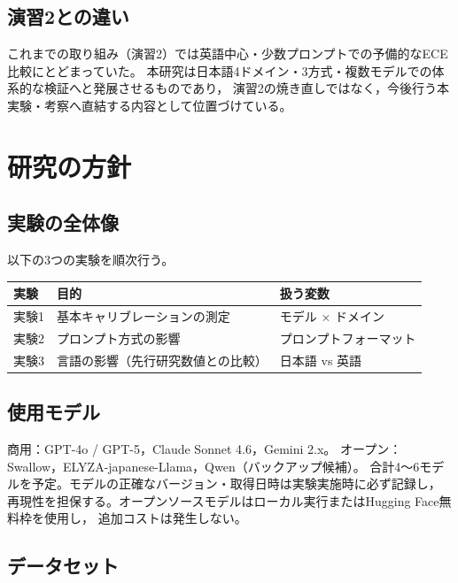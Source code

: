 \documentclass[11pt,a4paper,oneside]{article}
\begin{document}
\subsection{演習2との違い}

これまでの取り組み（演習2）では英語中心・少数プロンプトでの予備的なECE比較にとどまっていた。
本研究は日本語4ドメイン・3方式・複数モデルでの体系的な検証へと発展させるものであり，
演習2の焼き直しではなく，今後行う本実験・考察へ直結する内容として位置づけている。

\section{研究の方針}

\subsection{実験の全体像}

以下の3つの実験を順次行う。

\begin{center}
\begin{tabular}{lll}
\toprule
実験 & 目的 & 扱う変数 \\
\midrule
実験1 & 基本キャリブレーションの測定 & モデル × ドメイン \\
実験2 & プロンプト方式の影響 & プロンプトフォーマット \\
実験3 & 言語の影響（先行研究数値との比較） & 日本語 vs 英語 \\
\bottomrule
\end{tabular}
\end{center}

\subsection{使用モデル}

商用：GPT-4o / GPT-5，Claude Sonnet 4.6，Gemini 2.x。
オープン：Swallow，ELYZA-japanese-Llama，Qwen（バックアップ候補）。
合計4〜6モデルを予定。モデルの正確なバージョン・取得日時は実験実施時に必ず記録し，
再現性を担保する。オープンソースモデルはローカル実行またはHugging Face無料枠を使用し，
追加コストは発生しない。

\subsection{データセット}
\end{document}

